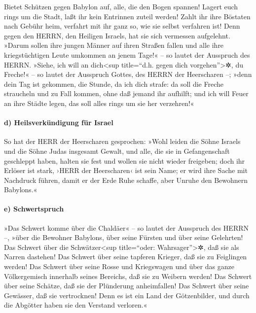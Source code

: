 Bietet Schützen gegen Babylon auf, alle, die den Bogen
spannen! Lagert euch rings um die Stadt, laßt ihr kein Entrinnen zuteil
werden! Zahlt ihr ihre Böstaten nach Gebühr heim, verfahrt mit ihr ganz
so, wie sie selbst verfahren ist! Denn gegen den HERRN, den Heiligen
Israels, hat sie sich vermessen aufgelehnt. »Darum sollen
ihre jungen Männer auf ihren Straßen fallen und alle ihre
kriegstüchtigen Leute umkommen an jenem Tage!« -- so lautet der
Ausspruch des HERRN. »Siehe, ich will an
dich\textless sup title=``d.h. gegen dich vorgehen''\textgreater✲, du
Freche!« -- so lautet der Ausspruch Gottes, des HERRN der Heerscharen
--; »denn dein Tag ist gekommen, die Stunde, da ich dich strafe:
da soll die Freche straucheln und zu Fall kommen, ohne
daß jemand ihr aufhilft; und ich will Feuer an ihre Städte legen, das
soll alles rings um sie her verzehren!«

\hypertarget{d-heilsverkuxfcndigung-fuxfcr-israel}{%
\paragraph{d) Heilsverkündigung für
Israel}\label{d-heilsverkuxfcndigung-fuxfcr-israel}}

So hat der HERR der Heerscharen gesprochen: »Wohl leiden
die Söhne Israels und die Söhne Judas insgesamt Gewalt, und alle, die
sie in Gefangenschaft geschleppt haben, halten sie fest und wollen sie
nicht wieder freigeben; doch ihr Erlöser ist stark, ›HERR
der Heerscharen‹ ist sein Name; er wird ihre Sache mit Nachdruck führen,
damit er der Erde Ruhe schaffe, aber Unruhe den Bewohnern Babylons.«

\hypertarget{e-schwertspruch}{%
\paragraph{e) Schwertspruch}\label{e-schwertspruch}}

»Das Schwert komme über die Chaldäer« -- so lautet der
Ausspruch des HERRN --, »über die Bewohner Babylons, über seine Fürsten
und über seine Gelehrten! Das Schwert über die
Schwätzer\textless sup title=``oder: Wahrsager''\textgreater✲, daß sie
als Narren dastehen! Das Schwert über seine tapferen Krieger, daß sie zu
Feiglingen werden! Das Schwert über seine Rosse und
Kriegswagen und über das ganze Völkergemisch innerhalb seines Bereichs,
daß sie zu Weibern werden! Das Schwert über seine Schätze, daß sie der
Plünderung anheimfallen! Das Schwert über seine Gewässer,
daß sie vertrocknen! Denn es ist ein Land der Götzenbilder, und durch
die Abgötter haben sie den Verstand verloren.«

